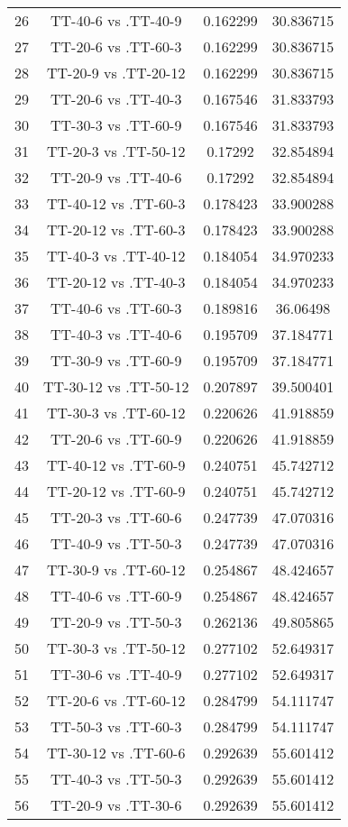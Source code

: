 \documentclass[a4paper,10pt]{article}
\begin{document}
\begin{landscape}
\begin{table}[!htp]
\begin{tabular}{cccc}
26&TT-40-6 vs .TT-40-9&0.162299&30.836715\\
27&TT-20-6 vs .TT-60-3&0.162299&30.836715\\
28&TT-20-9 vs .TT-20-12&0.162299&30.836715\\
29&TT-20-6 vs .TT-40-3&0.167546&31.833793\\
30&TT-30-3 vs .TT-60-9&0.167546&31.833793\\
31&TT-20-3 vs .TT-50-12&0.17292&32.854894\\
32&TT-20-9 vs .TT-40-6&0.17292&32.854894\\
33&TT-40-12 vs .TT-60-3&0.178423&33.900288\\
34&TT-20-12 vs .TT-60-3&0.178423&33.900288\\
35&TT-40-3 vs .TT-40-12&0.184054&34.970233\\
36&TT-20-12 vs .TT-40-3&0.184054&34.970233\\
37&TT-40-6 vs .TT-60-3&0.189816&36.06498\\
38&TT-40-3 vs .TT-40-6&0.195709&37.184771\\
39&TT-30-9 vs .TT-60-9&0.195709&37.184771\\
40&TT-30-12 vs .TT-50-12&0.207897&39.500401\\
41&TT-30-3 vs .TT-60-12&0.220626&41.918859\\
42&TT-20-6 vs .TT-60-9&0.220626&41.918859\\
43&TT-40-12 vs .TT-60-9&0.240751&45.742712\\
44&TT-20-12 vs .TT-60-9&0.240751&45.742712\\
45&TT-20-3 vs .TT-60-6&0.247739&47.070316\\
46&TT-40-9 vs .TT-50-3&0.247739&47.070316\\
47&TT-30-9 vs .TT-60-12&0.254867&48.424657\\
48&TT-40-6 vs .TT-60-9&0.254867&48.424657\\
49&TT-20-9 vs .TT-50-3&0.262136&49.805865\\
50&TT-30-3 vs .TT-50-12&0.277102&52.649317\\
51&TT-30-6 vs .TT-40-9&0.277102&52.649317\\
52&TT-20-6 vs .TT-60-12&0.284799&54.111747\\
53&TT-50-3 vs .TT-60-3&0.284799&54.111747\\
54&TT-30-12 vs .TT-60-6&0.292639&55.601412\\
55&TT-40-3 vs .TT-50-3&0.292639&55.601412\\
56&TT-20-9 vs .TT-30-6&0.292639&55.601412\\

\end{tabular}
\end{table}
\end{landscape}
\end{document}

